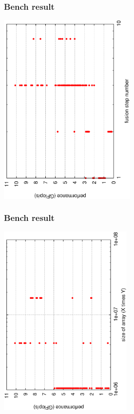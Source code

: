 \documentclass[dvipdfmx,cjk]{beamer}
\begin{document}
\begin{frame}[fragile]\frametitle{Bench result}
\begin{center}
\includegraphics[height=9.7cm,angle=270]{figure/bench_fusion.eps}
\end{center}
\end{frame}
\begin{frame}[fragile]\frametitle{Bench result}
\begin{center}
\includegraphics[height=9.7cm,angle=270]{figure/bench_space_size.eps}
\end{center}
\end{frame}
\end{document}
